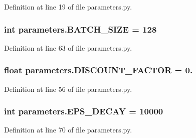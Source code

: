 Definition at line 19 of file parameters.\+py.

\subsubsection[{\texorpdfstring{B\+A\+T\+C\+H\+\_\+\+S\+I\+ZE}{BATCH_SIZE}}]{\setlength{\rightskip}{0pt plus 5cm}int parameters.\+B\+A\+T\+C\+H\+\_\+\+S\+I\+ZE = 128}\hypertarget{namespaceparameters_a2d37d9950f7a887014021ab455282af6}{}\label{namespaceparameters_a2d37d9950f7a887014021ab455282af6}


Definition at line 63 of file parameters.\+py.

\subsubsection[{\texorpdfstring{D\+I\+S\+C\+O\+U\+N\+T\+\_\+\+F\+A\+C\+T\+OR}{DISCOUNT_FACTOR}}]{\setlength{\rightskip}{0pt plus 5cm}float parameters.\+D\+I\+S\+C\+O\+U\+N\+T\+\_\+\+F\+A\+C\+T\+OR = 0.}\hypertarget{namespaceparameters_a70176024e0f585c846365800f1c7819c}{}\label{namespaceparameters_a70176024e0f585c846365800f1c7819c}


Definition at line 56 of file parameters.\+py.

\subsubsection[{\texorpdfstring{E\+P\+S\+\_\+\+D\+E\+C\+AY}{EPS_DECAY}}]{\setlength{\rightskip}{0pt plus 5cm}int parameters.\+E\+P\+S\+\_\+\+D\+E\+C\+AY = 10000}\hypertarget{namespaceparameters_ab9a88c663385563b35331bbea5c4a74b}{}\label{namespaceparameters_ab9a88c663385563b35331bbea5c4a74b}


Definition at line 70 of file parameters.\+py.

